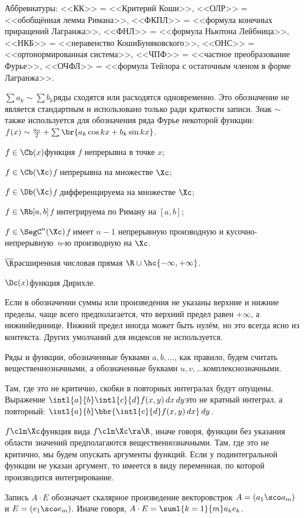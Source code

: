 \documentclass[a4paper]{article}
\newcommand{\intlab}{\intl{a}{b}}
\begin{document}
\begin{points}{-3}
\item Аббревиатуры: <<КК>> = <<Критерий Коши>>, <<ОЛР>> = <<обобщённая лемма
      Римана>>, <<ФКПЛ>> = <<формула конечных приращений Лагранжа>>, <<ФНЛ>> = <<формула Ньютона\ч
      Лейбница>>, <<НКБ>> = <<неравенство Коши\ч Буняковского>>, <<ОНС>> = <<ортонормированная система>>,
      <<ЧПФ>> = <<частное преобразование Фурье>>, <<ОЧФЛ>> = <<формула Тейлора с остаточным членом в
      форме Лагранжа>>.
\item $\sum a_k \sim \sum b_k$\т ряды сходятся или расходятся одновременно. Это обозначение не является
      стандартным и использовано только ради краткости записи. Знак $\sim$ также
      используется для обозначения ряда Фурье некоторой функции:
      $f(x) \sim \frac{a_0}{2} + \sum \br{a_k\cos kx + b_k\sin kx}$.
\item \begin{items}{-3}
      \item $f \in\Cb(x)$\т функция $f$ непрерывна в точке $x$;
      \item $f \in\Cb(\Xc)$\т $f$ непрерывна на множестве $\Xc$;
      \item $f \in\Db(\Xc)$\т $f$ дифференцируема на множестве $\Xc$;
      \item $f \in\Rb[a,b]$\т $f$ интегрируема по Риману на $[a,b]$;
      \item $f\in\SegC^n(\Xc)$\т $f$ имеет $n-1$ непрерывную производную и кусочно-непрерывную~$n$-ю
            производную на $\Xc$.
      \end{items}
\item $\overline{\R}$\т расширенная числовая прямая $\R \cup \hc{-\infty, +\infty}$.
\item $\Dc(x)$\т функция Дирихле.
\item Если в обозначении суммы или произведения не указаны верхние и нижние пределы, чаще всего предполагается,
      что верхний предел равен $+\infty$, а нижний\т единице. Нижний предел иногда может быть нулём,
      но это всегда ясно из контекста. Других умолчаний для индексов не используется.
\item Ряды и функции, обозначенные буквами $a,b,\dots$, как правило, будем считать вещественнозначными,
      а обозначенные буквами $u,v,\dots$\т комплекснозначными.
\item Там, где это не критично, скобки в повторных интегралах будут опущены.
      Выражение $\intlab \intl{c}{d}f(x,y)\,d x \,d y$\т это не кратный интеграл, а повторный:
      $\intlab \bbr{\intl{c}{d}f(x,y)\,d x}\,d y$.
\item $f\cln \Xc$\т функция вида $f\cln\Xc\ra\R$, иначе говоря, функции без указания области значений
      предполагаются вещественнозначными. Там, где это не критично,
      мы будем опускать аргументы функций. Если у подинтегральной функции не указан аргумент,
      то имеется в виду переменная, по которой производится интегрирование.
\item Запись $A \cdot E$ обозначает скалярное произведение векторов\д строк $A = (a_1\sco a_m)$ и $E = (e_1\sco e_m)$.
      Иначе говоря, $A\cdot E = \suml{k=1}{m} a_k e_k$.
\end{points}
\end{document}
